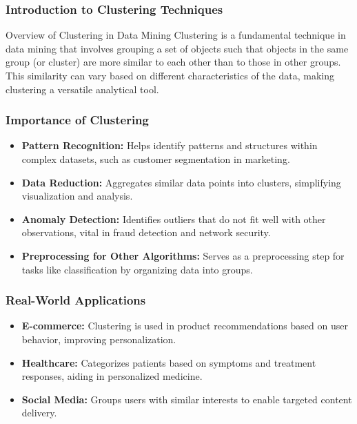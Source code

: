 \documentclass[aspectratio=169]{beamer}
\begin{document}
\frame{\titlepage}

\begin{frame}[fragile]
    \frametitle{Introduction to Clustering Techniques}
    \begin{block}{Overview of Clustering in Data Mining}
        Clustering is a fundamental technique in data mining that involves grouping a set of objects such that objects in the same group (or cluster) are more similar to each other than to those in other groups. This similarity can vary based on different characteristics of the data, making clustering a versatile analytical tool.
    \end{block}
\end{frame}

\begin{frame}[fragile]
    \frametitle{Importance of Clustering}
    \begin{itemize}
        \item \textbf{Pattern Recognition:} Helps identify patterns and structures within complex datasets, such as customer segmentation in marketing.
        \item \textbf{Data Reduction:} Aggregates similar data points into clusters, simplifying visualization and analysis.
        \item \textbf{Anomaly Detection:} Identifies outliers that do not fit well with other observations, vital in fraud detection and network security.
        \item \textbf{Preprocessing for Other Algorithms:} Serves as a preprocessing step for tasks like classification by organizing data into groups.
    \end{itemize}
\end{frame}

\begin{frame}[fragile]
    \frametitle{Real-World Applications}
    \begin{itemize}
        \item \textbf{E-commerce:} Clustering is used in product recommendations based on user behavior, improving personalization.
        \item \textbf{Healthcare:} Categorizes patients based on symptoms and treatment responses, aiding in personalized medicine.
        \item \textbf{Social Media:} Groups users with similar interests to enable targeted content delivery.
    \end{itemize}
\end{frame}
\end{document}
